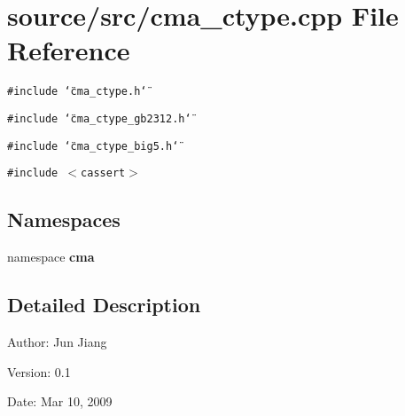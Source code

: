\section{source/src/cma\_\-ctype.cpp File Reference}
\label{cma__ctype_8cpp}
{\tt \#include \char`\"{}cma\_\-ctype.h\char`\"{}}\par
{\tt \#include \char`\"{}cma\_\-ctype\_\-gb2312.h\char`\"{}}\par
{\tt \#include \char`\"{}cma\_\-ctype\_\-big5.h\char`\"{}}\par
{\tt \#include $<$cassert$>$}\par
\subsection*{Namespaces}
\begin{CompactItemize}
\item 
namespace \textbf{cma}
\end{CompactItemize}


\subsection{Detailed Description}
\begin{Desc}
\item[Author:]Jun Jiang \end{Desc}
\begin{Desc}
\item[Version:]0.1 \end{Desc}
\begin{Desc}
\item[Date:]Mar 10, 2009 \end{Desc}
